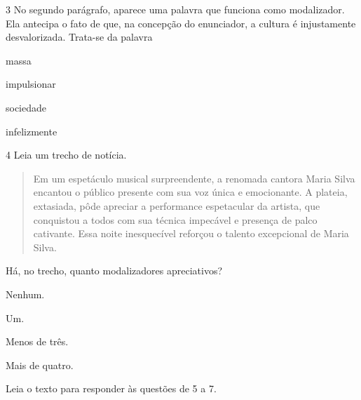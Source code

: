 \num{3} No segundo parágrafo, aparece uma palavra que funciona como
modalizador. Ela antecipa o fato de que, na concepção do enunciador, a
cultura é injustamente desvalorizada. Trata-se da palavra

\begin{escolha}
\item
  massa
\item
  impulsionar
\item
  sociedade
\item
  infelizmente
\end{escolha}

\num{4} Leia um trecho de notícia.


\begin{quote}
Em um espetáculo musical surpreendente, a renomada cantora Maria Silva
encantou o público presente com sua voz única e emocionante. A plateia,
extasiada, pôde apreciar a performance espetacular da artista, que
conquistou a todos com sua técnica impecável e presença de palco
cativante. Essa noite inesquecível reforçou o talento excepcional de
Maria Silva.
\end{quote}

Há, no trecho, quanto modalizadores apreciativos?

\begin{escolha}
\item
  Nenhum.
\item
  Um.
\item
  Menos de três.
\item
  Mais de quatro.
\end{escolha}

\pagebreak
Leia o texto para responder às questões de 5 a 7.

